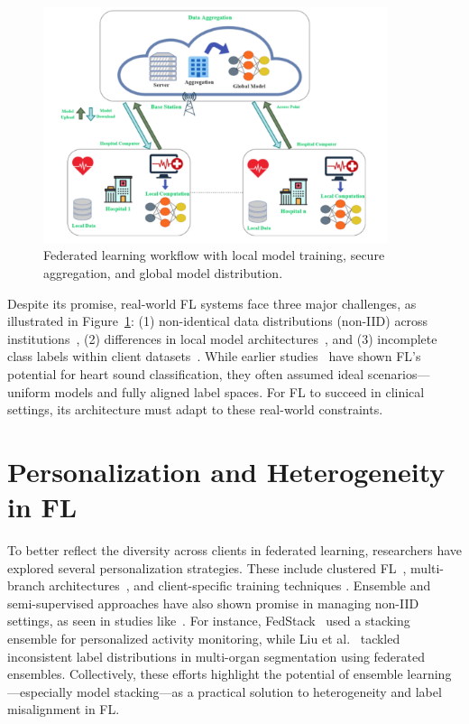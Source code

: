 \begin{figure}[ht]
    \centering
    \includegraphics[width=0.9\textwidth]{./Figures/fig2.png}
    \caption{Federated learning workflow with local model training, secure aggregation, and global model distribution.}
    \label{fig:fl_workflow}
\end{figure}

Despite its promise, real-world FL systems face three major challenges, as illustrated in Figure~\ref{fig:fl_workflow}: (1) non-identical data distributions (non-IID) across institutions~\cite{nguyen2022federated}, (2) differences in local model architectures~\cite{yoo2021personalized}, and (3) incomplete class labels within client datasets~\cite{zhang2022federated}. While earlier studies~\cite{qiu2022binary, qiu2024multiclass} have shown FL’s potential for heart sound classification, they often assumed ideal scenarios—uniform models and fully aligned label spaces. For FL to succeed in clinical settings, its architecture must adapt to these real-world constraints.

\section{Personalization and Heterogeneity in FL}
To better reflect the diversity across clients in federated learning, researchers have explored several personalization strategies. These include clustered FL~\cite{yoo2021personalized}, multi-branch architectures~\cite{mori2023multi}, and client-specific training techniques  \cite{tan2023towards} \cite{huang2022learn}. Ensemble and semi-supervised approaches have also shown promise in managing non-IID settings, as seen in studies like~\cite{itahara2023distillation, shaik2022fedstack}. For instance, FedStack~\cite{shaik2022fedstack} used a stacking ensemble for personalized activity monitoring, while Liu et al.~\cite{xu2023federated} tackled inconsistent label distributions in multi-organ segmentation using federated ensembles. Collectively, these efforts highlight the potential of ensemble learning—especially model stacking—as a practical solution to heterogeneity and label misalignment in FL.

